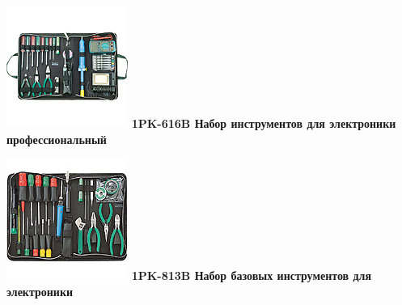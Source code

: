 {

\begin{multicols}{2}
\noindent\includegraphics[width=\columnwidth]{00/fig/pros/1PK-616B.jpg}
\textbf{1PK-616B Набор инструментов для электроники профессиональный}

\columnbreak

\noindent\includegraphics[width=\columnwidth]{00/fig/pros/1PK-813B.jpg}
\textbf{1PK-813B Набор базовых инструментов для электроники}
\end{multicols}

}
